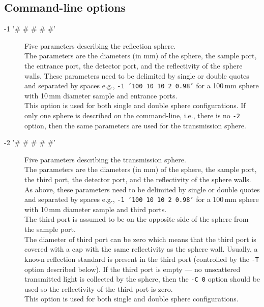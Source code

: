 \documentclass{article}
\begin{document}
\subsection{Command-line options}
\begin{description}
    \item[-1 '\# \# \# \# \#'] Five parameters describing the reflection sphere.\\[1mm]
                 The parameters are the diameters (in mm) of the sphere, the sample port, the entrance port, 
                 the detector port, and the reflectivity of the sphere walls.  These parameters need 
                 to be delimited by single or double quotes and separated by spaces e.g., \texttt{-1 '100 10 10 2 0.98'}
                 for a 100\,mm sphere with 10\,mm diameter sample and entrance ports.\\[1mm]
                 This option is used for both single and double sphere configurations. 
                 If only one sphere is described on the command-line, i.e., there is no \texttt{-2} option, then
                 the same parameters are used for the transmission sphere.

    \item[-2 '\# \# \# \# \#'] Five parameters describing the transmission sphere.\\[1mm]
                 The parameters are the diameters (in mm) of the sphere, the sample port, the third port, 
                 the detector port, and the reflectivity of the sphere walls.  As above, these parameters need 
                 to be delimited by single or double quotes and separated by spaces e.g., \texttt{-1 '100 10 10 2 0.98'}
                 for a 100\,mm sphere with 10\,mm diameter sample and third ports.\\[1mm]
                 The third port is assumed to be on the opposite side of the sphere from the sample port. \\[1mm]
                 The diameter of third port can be zero which means that the third port is
                 covered with a cap with the same reflectivity as the sphere wall.  Usually,
                 a known reflection standard is present in the third port (controlled by the \texttt{-T}
                 option described below).  If the third port is empty --- no unscattered transmitted light
                 is collected by the sphere, then the \texttt{-C 0} option should be used so the reflectivity
                 of the third port is zero.\\[1mm]
                 This option is used for both single and double sphere configurations.


\end{description}
\end{document}
